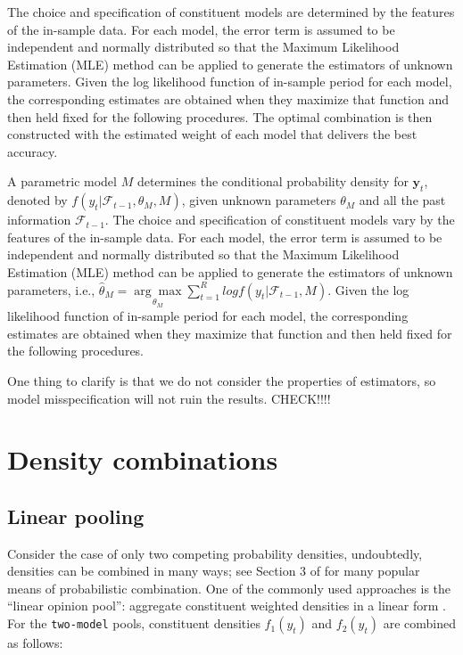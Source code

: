 \documentclass{monashthesis}
\begin{document}
The choice and specification of constituent models are determined by the features of the in-sample data. For each model, the error term is assumed to be independent and normally distributed so that the Maximum Likelihood Estimation (MLE) method can be applied to generate the estimators of unknown parameters. Given the log likelihood function of in-sample period for each model, the corresponding estimates are obtained when they maximize that function and then held fixed for the following procedures. The optimal combination is then constructed with the estimated weight of each model that delivers the best accuracy.

A parametric model \(M\) determines the conditional probability density for \(\textbf{y}_t\), denoted by \(f(y_t|\mathcal{F}_{t-1}, \theta_M, M)\), given unknown parameters \(\theta_M\) and all the past information \(\mathcal{F}_{t-1}\). The choice and specification of constituent models vary by the features of the in-sample data. For each model, the error term is assumed to be independent and normally distributed so that the Maximum Likelihood Estimation (MLE) method can be applied to generate the estimators of unknown parameters, i.e., \(\hat\theta_M = \underset{\theta_M}{\arg\max} \sum^R_{t=1} log f(y_t|\mathcal{F}_{t-1}, M)\). Given the log likelihood function of in-sample period for each model, the corresponding estimates are obtained when they maximize that function and then held fixed for the following procedures.

One thing to clarify is that we do not consider the properties of estimators, so model misspecification will not ruin the results. CHECK!!!!

\hypertarget{density-combinations}{%
\section{Density combinations}\label{density-combinations}}

\hypertarget{linear-pooling}{%
\subsection{Linear pooling}\label{linear-pooling}}

Consider the case of only two competing probability densities, undoubtedly, densities can be combined in many ways; see Section 3 of \textcite{WHLK22} for many popular means of probabilistic combination. One of the commonly used approaches is the ``linear opinion pool'': aggregate constituent weighted densities in a linear form \autocites[e.g.,][]{BG69,HM07,GA11}. For the \texttt{two-model} pools, constituent densities \(f_1(y_t)\) and \(f_2(y_t)\) are combined as follows:
\end{document}
